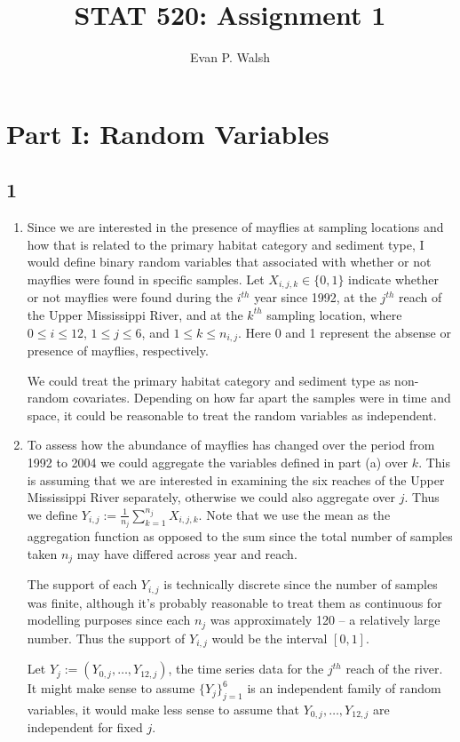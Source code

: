 \documentclass[12pt]{article}
\title{STAT 520: Assignment 1}
\author{Evan P. Walsh}
\begin{document}
\maketitle


\section*{Part I: Random Variables}

\subsection*{1}
\begin{enumerate}[label=(\alph*)]
  \item Since we are interested in the presence of mayflies at sampling locations and how that is related to the primary habitat category and sediment
    type, I would define binary random variables that associated with whether or not mayflies were found in specific samples.
    Let $X_{i,j,k} \in \{0,1\}$ indicate whether or not mayflies were found during the $i^{th}$ year since 1992, at the $j^{th}$ reach of the Upper
    Mississippi River, and at the $k^{th}$ sampling location, where $0 \leq i \leq 12$, $1 \leq j \leq 6$, and $1 \leq k \leq n_{i,j}$.
    Here 0 and 1 represent the absense or presence of mayflies, respectively.

    We could treat the primary habitat category and sediment type as non-random covariates. Depending on how far apart the samples were in time and
    space, it could be reasonable to treat the random variables as independent.

  \item To assess how the abundance of mayflies has changed over the period from 1992 to 2004 we could aggregate the variables defined in part (a)
    over $k$. This is assuming that we are interested in examining the six reaches of the Upper Mississippi River separately, otherwise we could also
    aggregate over $j$. Thus we define $Y_{i,j} := \frac{1}{n_{j}}\sum_{k=1}^{n_{j}}X_{i,j,k}$. Note that we use the mean as the aggregation function
    as opposed to the sum since the total number of samples taken $n_{j}$ may have differed across year and reach.

    The support of each $Y_{i,j}$ is technically discrete since the number of samples was finite, although it's probably reasonable to treat them as
    continuous for modelling purposes since each $n_{j}$ was approximately 120 -- a relatively large number. Thus the support of $Y_{i,j}$ would be
    the interval $[0, 1]$.

    Let $Y_{j} := (Y_{0,j}, \dots, Y_{12, j})$, the time series data for the $j^{th}$ reach of the river. It might make sense to assume
    $\{Y_j\}_{j=1}^{6}$ is an independent family of random variables, it would make less sense to assume that $Y_{0,j}, \dots, Y_{12,j}$ are
    independent for fixed $j$.
\end{enumerate}
\end{document}

